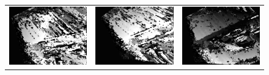 \documentclass[11pt]{report}
\begin{document}
\begin{figure}[H]
\begin{tabular}{ccc}
    \includegraphics[scale=0.1]{images/disparity-opencv-t/disparity_17.png} &
    \includegraphics[scale=0.1]{images/disparity-opencv-d/disparity_17.png} &
    \includegraphics[scale=0.1]{images/disparity-opengv/disparity_17.png} \\

\end{tabular}
\end{figure}
\end{document}
